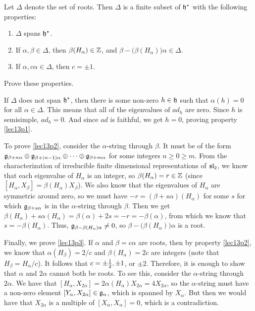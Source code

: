  Let $\Delta$ denote the set of roots. Then $\Delta$ is a finite subset of $\h^*$ with the
 following properties:
 \begin{enumerate}
 \item \label{lec13p1} $\Delta$ spans $\h^*$.
 \item \label{lec13p2} If $\alpha, \beta\in \Delta$, then $\beta(H_\alpha)\in \ZZ$, and
 $\beta-\bigl(\beta(H_\alpha)\bigr)\alpha \in \Delta$.
 \item \label{lec13p3} If $\alpha, c\alpha\in \Delta$, then $c=\pm 1$.
 \end{enumerate}
 \begin{exercise}
    Prove these properties.
   \begin{solution}
     If $\Delta$ does not span $\h^*$, then there is some non-zero $h\in \h$ such that
     $\alpha(h)=0$ for all $\alpha\in \Delta$. This means that all of the eigenvalues
     of $ad_h$ are zero. Since $h$ is semisimple, $ad_h=0$. And since $ad$ is
     faithful, we get $h=0$, proving property \ref{lec13p1}.

     To prove \ref{lec13p2}, consider the $\alpha$-string through $\beta$. It must be
     of the form $\g_{\beta+n\alpha}\oplus \g_{\beta+(n-1)\alpha}\oplus \cdots\oplus
     \g_{\beta+m\alpha}$ for some integers $n\ge 0\ge m$. From the characterization of
     irreducible finite dimensional representations of $\sl_2$, we know that each
     eigenvalue of $H_\alpha$ is an integer, so $\beta(H_\alpha)=r\in \ZZ$ (since
     $[H_\alpha,X_\beta]=\beta(H_\alpha)X_\beta$). We also know that the eigenvalues
     of $H_\alpha$ are symmetric around zero, so we must have
     $-r=(\beta+s\alpha)(H_\alpha)$ for some $s$ for which $\g_{\beta+s\alpha}$ is in
     the $\alpha$-string through $\beta$. Then we get
     $\beta(H_\alpha)+s\alpha(H_\alpha)=\beta(\alpha)+2s=-r=-\beta(\alpha)$, from which
     we know that $s=-\beta(H_\alpha)$. Thus, $\g_{\beta-\beta(H_\alpha)\alpha}\neq
     0$, so $\beta-\bigl(\beta(H_\alpha)\bigr)\alpha$ is a root.

     Finally, we prove \ref{lec13p3}. If $\alpha$ and $\beta=c\alpha$ are roots, then
     by property \ref{lec13p2}, we know that $\alpha(H_\beta)=2/c$ and
     $\beta(H_\alpha)=2c$ are integers (note that $H_\beta=H_\alpha/c$). It follows
     that $c=\pm \half, \pm 1$, or $\pm 2$. Therefore, it is enough to show that
     $\alpha$ and $2\alpha$ cannot both be roots. To see this, consider the
     $\alpha$-string through $2\alpha$. We have that $[H_\alpha,
     X_{2\alpha}]=2\alpha(H_\alpha) X_{2\alpha}=4X_{2\alpha}$, so the $\alpha$-string
     must have a non-zero element $[Y_\alpha,X_{2\alpha}]\in \g_\alpha$, which is
     spanned by $X_\alpha$. But then we would have that $X_{2\alpha}$ is a multiple of
     $[X_\alpha,X_\alpha]=0$, which is a contradiction.
   \end{solution}
 \end{exercise}
